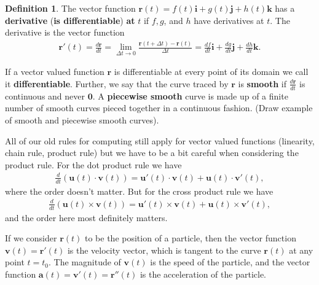 \documentclass[12pt, letter]{article}
\theoremstyle{plain}
\numberwithin{theorem}{section}
\theoremstyle{definition}
\newtheorem{definition}[theorem]{Definition}
\begin{document}
\bigskip

\hrulefill

\bigskip

\begin{definition}
The vector function $\bm{r}(t) = f(t) \bm{i} + g(t) \bm{j} + h(t) \bm{k}$ has a \textbf{derivative} (\textbf{is differentiable}) \textbf{at} $t$ if $f, g$, and $h$ have derivatives at $t$. The derivative is the vector function
\begin{align*}
\bm{r}'(t) = \frac{d\bm{r}}{dt} = \lim_{\Delta t \to 0} \frac{\bm{r}(t+\Delta t) - \bm{r}(t)}{\Delta t} = \frac{df}{dt} \bm{i} + \frac{dg}{dt} \bm{j} + \frac{dh}{dt} \bm{k}.
\end{align*}
\end{definition}

\bigskip

If a vector valued function $\bm{r}$ is differentiable at every point of its domain we call it \textbf{differentiable}. Further, we say that the curve traced by $\bm{r}$ is \textbf{smooth} if $\frac{d\bm{r}}{dt}$ is continuous and never $\bm{0}$. A \textbf{piecewise smooth} curve is made up of a finite number of smooth curves pieced together in a continuous fashion. (Draw example of smooth and piecewise smooth curves).

\bigskip

\hrulefill

\bigskip

All of our old rules for computing still apply for vector valued functions (linearity, chain rule, product rule) but we have to be a bit careful when considering the product rule. For the dot product rule we have
\begin{align*}
\frac{d}{dt}\left(\bm{u}(t) \cdot \bm{v}(t)\right) = \bm{u}'(t) \cdot \bm{v}(t) + \bm{u}(t) \cdot \bm{v}'(t),
\end{align*} 
where the order doesn't matter. But for the cross product rule we have
\begin{align*}
\frac{d}{dt}\left(\bm{u}(t) \times \bm{v}(t)\right) = \bm{u}'(t) \times \bm{v}(t) + \bm{u}(t) \times \bm{v}'(t),
\end{align*} 
and the order here most definitely matters.

\bigskip

\hrulefill

\bigskip

If we consider $\bm{r}(t)$ to be the position of a particle, then the vector function $\bm{v}(t) = \bm{r}'(t)$ is the velocity vector, which is tangent to the curve $\bm{r}(t)$ at any point $t=t_0$. The magnitude of $\bm{v}(t)$ is the speed of the particle, and the vector function $\bm{a}(t) = \bm{v}'(t) = \bm{r}''(t)$ is the acceleration of the particle.
\end{document}
